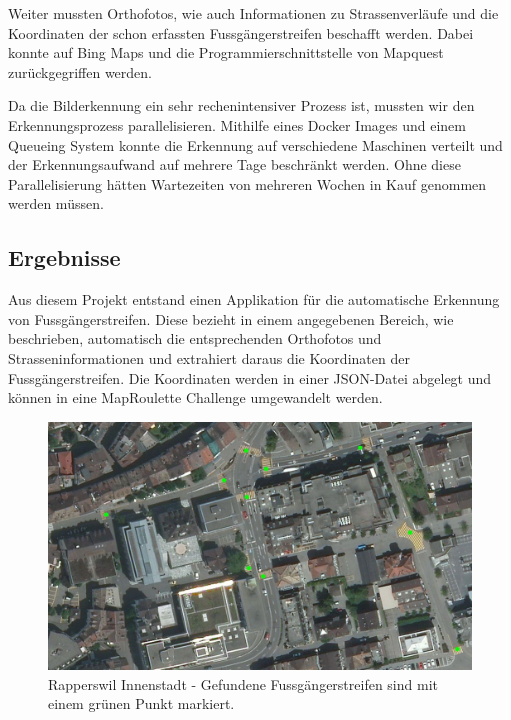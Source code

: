 Weiter mussten Orthofotos, wie auch Informationen zu Strassenverläufe und die Koordinaten der schon erfassten Fussgängerstreifen beschafft werden. Dabei konnte auf Bing Maps und die Programmierschnittstelle von Mapquest zurückgegriffen werden.

Da die Bilderkennung ein sehr rechenintensiver Prozess ist, mussten wir den Erkennungsprozess parallelisieren. Mithilfe eines Docker Images und einem Queueing System konnte die Erkennung auf verschiedene Maschinen verteilt und der Erkennungsaufwand auf mehrere Tage beschränkt werden. Ohne diese Parallelisierung hätten Wartezeiten von mehreren Wochen in Kauf genommen werden müssen.


\subsection*{Ergebnisse}
Aus diesem Projekt entstand einen Applikation für die automatische Erkennung von Fussgängerstreifen. Diese bezieht in einem angegebenen Bereich, wie beschrieben, automatisch die entsprechenden Orthofotos und Strasseninformationen und extrahiert daraus die Koordinaten der Fussgängerstreifen. Die Koordinaten werden in einer JSON-Datei abgelegt und können in eine MapRoulette Challenge umgewandelt werden. 
\\
\begin{figure}[H]
	\centering
	\includegraphics[width=\textwidth -10mm]{images/boxsave_rappi.png}
	\caption[Überblick]{Rapperswil Innenstadt - Gefundene Fussgängerstreifen sind mit einem grünen Punkt markiert.}
\end{figure}

